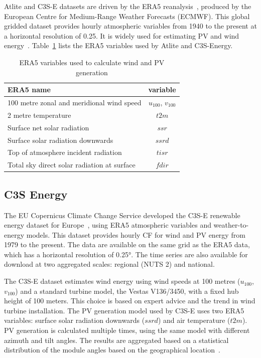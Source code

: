 \documentclass[preprint, 12pt, authoryear]{elsarticle}
\begin{document}
Atlite and C3S-E datasets are driven by the ERA5 reanalysis~\citep{hersbach2020era5}, produced by the European Centre for Medium-Range Weather Forecasts (ECMWF). This global gridded dataset provides hourly atmospheric variables from 1940 to the present at a horizontal resolution of 0.25\textdegree. It is widely used for estimating PV and wind energy~\citep{mockert2023drought, dubus2023energy, brown2021drought, otero2022drought}. Table~\ref{tab:var_name} lists the ERA5 variables used by Atlite and C3S-Energy.

\begin{table}[h!]
	\centering
	\caption{ERA5 variables used to calculate wind and PV generation}
	\begin{tabular}{|l|c|}
		\hline
		{\textbf{ERA5 name}}      & \textbf{variable} \\ \hline
		100 metre zonal and meridional wind speed   & $u_{100}$, $v_{100}$ \\
		2 metre temperature                         & $t2m$ \\
		Surface net solar radiation                 & $ssr$ \\
		Surface solar radiation downwards           & $ssrd$  \\
		Top of atmosphere incident radiation        & $tisr$  \\
		Total sky direct solar radiation at surface & $fdir$  \\ \hline
	\end{tabular}
	\label{tab:var_name}
\end{table}

\subsection{C3S Energy}
\label{sec:c3se}

The EU Copernicus Climate Change Service developed the C3S-E renewable energy dataset for Europe~\citep{dubus2023energy}, using ERA5 atmospheric variables and weather-to-energy models. This dataset provides hourly CF for wind and PV energy from 1979 to the present. The data are available on the same grid as the ERA5 data, which has a horizontal resolution of 0.25°. The time series are also available for download at two aggregated scales: regional (NUTS 2) and national.

The C3S-E dataset estimates wind energy using wind speeds at 100 metres ($u_{100}$, $v_{100}$) and a standard turbine model, the Vestas V136/3450, with a fixed hub height of 100 meters. This choice is based on expert advice and the trend in wind turbine installation. The PV generation model used by C3S-E uses two ERA5 variables: surface solar radiation downwards ($ssrd$) and air temperature ($t2m$). PV generation is calculated multiple times, using the same model with different azimuth and tilt angles. The results are aggregated based on a statistical distribution of the module angles based on the geographical location~\citep{saintdrenan2018solar}.
\end{document}
